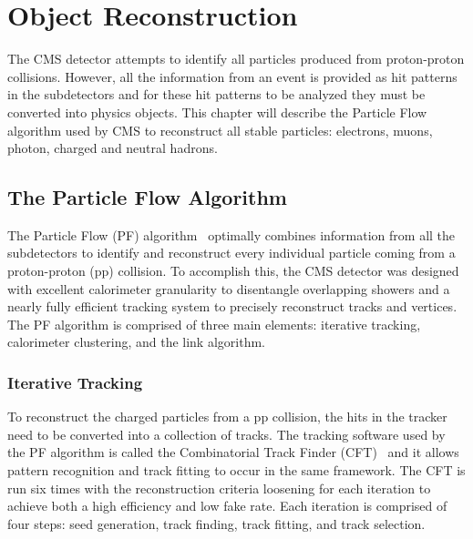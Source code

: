 \chapter{Object Reconstruction}
\label{ch:ObjReco}

The CMS detector attempts to identify all particles produced from proton-proton collisions. However, all the information from an event is provided as hit patterns in the subdetectors and for these hit patterns to be analyzed they must be converted into physics objects. This chapter will describe the Particle Flow algorithm used by CMS to reconstruct all stable particles: electrons, muons, photon, charged and neutral hadrons. 

\section{The Particle Flow Algorithm}

The Particle Flow (PF) algorithm~\cite{PFAlgorithm, PFReconstruction} optimally combines information from all the subdetectors to identify and reconstruct every individual particle coming from a proton-proton (pp) collision. To accomplish this, the CMS detector was designed with excellent calorimeter granularity to disentangle overlapping showers and a nearly fully efficient tracking system to precisely reconstruct tracks and vertices. The PF algorithm is comprised of three main elements: iterative tracking, calorimeter clustering, and the link algorithm.

\subsection{Iterative Tracking}

To reconstruct the charged particles from a pp collision, the hits in the tracker need to be converted into a collection of tracks. The tracking software used by the PF algorithm is called the Combinatorial Track Finder (CFT)~\cite{TrackReco} and it allows pattern recognition and track fitting to occur in the same framework. The CFT is run six times with the reconstruction criteria loosening for each iteration to achieve both a high efficiency and low fake rate. Each iteration is comprised of four steps: seed generation, track finding, track fitting, and track selection.

